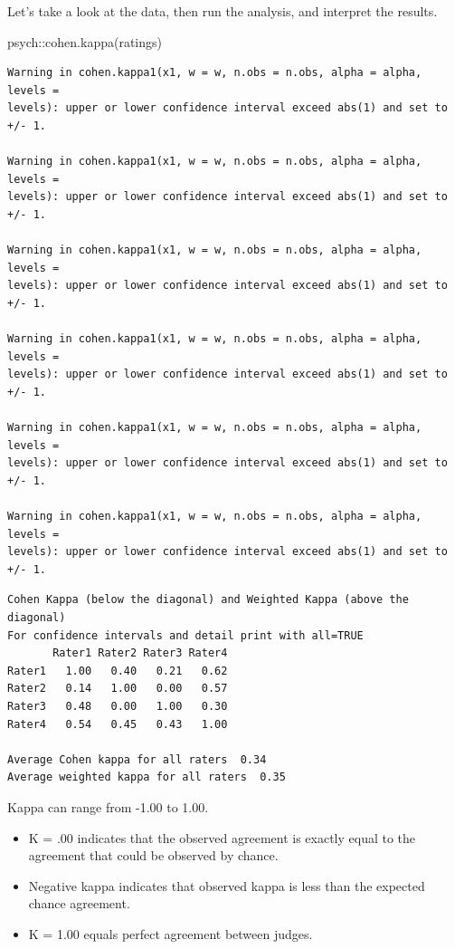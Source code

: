 \documentclass[
  english,
]{book}
\newenvironment{Shaded}{\begin{snugshade}}{\end{snugshade}}
\newcommand{\FunctionTok}[1]{\textcolor[rgb]{0.00,0.00,0.00}{#1}}
\newcommand{\NormalTok}[1]{#1}
\newcommand{\SpecialCharTok}[1]{\textcolor[rgb]{0.00,0.00,0.00}{#1}}
\providecommand{\tightlist}{%
  \setlength{\itemsep}{0pt}\setlength{\parskip}{0pt}}
\begin{document}
Let's take a look at the data, then run the analysis, and interpret the results.

\begin{Shaded}
\begin{Highlighting}[]
\NormalTok{psych}\SpecialCharTok{::}\FunctionTok{cohen.kappa}\NormalTok{(ratings)}
\end{Highlighting}
\end{Shaded}

\begin{verbatim}
Warning in cohen.kappa1(x1, w = w, n.obs = n.obs, alpha = alpha, levels =
levels): upper or lower confidence interval exceed abs(1) and set to +/- 1.

Warning in cohen.kappa1(x1, w = w, n.obs = n.obs, alpha = alpha, levels =
levels): upper or lower confidence interval exceed abs(1) and set to +/- 1.

Warning in cohen.kappa1(x1, w = w, n.obs = n.obs, alpha = alpha, levels =
levels): upper or lower confidence interval exceed abs(1) and set to +/- 1.

Warning in cohen.kappa1(x1, w = w, n.obs = n.obs, alpha = alpha, levels =
levels): upper or lower confidence interval exceed abs(1) and set to +/- 1.

Warning in cohen.kappa1(x1, w = w, n.obs = n.obs, alpha = alpha, levels =
levels): upper or lower confidence interval exceed abs(1) and set to +/- 1.

Warning in cohen.kappa1(x1, w = w, n.obs = n.obs, alpha = alpha, levels =
levels): upper or lower confidence interval exceed abs(1) and set to +/- 1.
\end{verbatim}

\begin{verbatim}
Cohen Kappa (below the diagonal) and Weighted Kappa (above the diagonal) 
For confidence intervals and detail print with all=TRUE
       Rater1 Rater2 Rater3 Rater4
Rater1   1.00   0.40   0.21   0.62
Rater2   0.14   1.00   0.00   0.57
Rater3   0.48   0.00   1.00   0.30
Rater4   0.54   0.45   0.43   1.00

Average Cohen kappa for all raters  0.34
Average weighted kappa for all raters  0.35
\end{verbatim}

Kappa can range from -1.00 to 1.00.

\begin{itemize}
\tightlist
\item
  K = .00 indicates that the observed agreement is exactly equal to the agreement that could be observed by chance.
\item
  Negative kappa indicates that observed kappa is less than the expected chance agreement.
\item
  K = 1.00 equals perfect agreement between judges.
\end{itemize}
\end{document}
